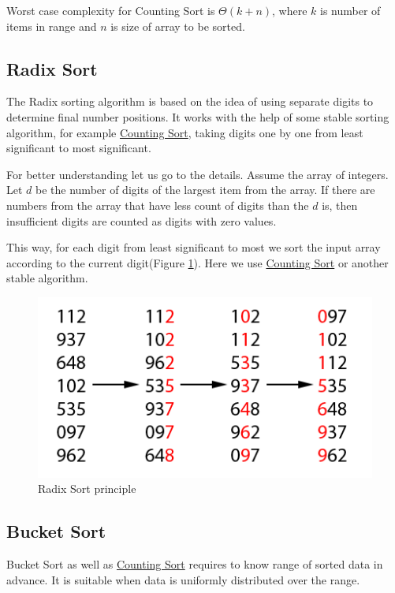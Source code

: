 \documentclass[
  field=inf,
  biblatex,
  language=english,
  glossaries,
  theorems=false,
  sourcecodes=false,
  index
]{kidiplom}
\begin{document}
Worst case complexity for Counting Sort is $\Theta(k + n)$, where $k$ is number of items in range and $n$ is size of array to be sorted.

\subsection{Radix Sort}

The Radix sorting algorithm is based on the idea of using separate digits to determine final number positions. It works with the help of some stable sorting algorithm, for example \hyperref[sec:counting]{Counting Sort}, taking digits one by one from least significant to most significant.

For better understanding let us go to the details. Assume the array of integers. Let $d$ be the number of digits of the largest item from the array. If there are numbers from the array that have less count of digits than the $d$ is, then insufficient digits are counted as digits with zero values.

This way, for each digit from least significant to most we sort the input array according to the current digit(Figure \ref{fig:radixsort}). Here we use \hyperref[sec:counting]{Counting Sort} or another stable algorithm.

\begin{figure}[H]
\begin{center}
	
	\includegraphics[scale=2]{img/Radixsort.png}
	\caption{Radix Sort principle}\label{fig:radixsort}
\end{center}
\end{figure}

\subsection{Bucket Sort}

Bucket Sort as well as \hyperref[sec:counting]{Counting Sort} requires to know range of sorted data in advance. It is suitable when data is uniformly distributed over the range.
\end{document}
